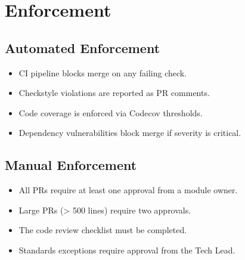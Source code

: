 \documentclass[
    language=english,
    doctype=standard,
    institution=none,
    titlestyle=book,
    oneside,
]{../../omnilatex}
\begin{document}
\chapter{Enforcement}
\label{sec:enforcement}

\section{Automated Enforcement}

\begin{itemize}
    \item CI pipeline blocks merge on any failing check.
    \item Checkstyle violations are reported as PR comments.
    \item Code coverage is enforced via Codecov thresholds.
    \item Dependency vulnerabilities block merge if severity is critical.
\end{itemize}

\section{Manual Enforcement}

\begin{itemize}
    \item All PRs require at least one approval from a module owner.
    \item Large PRs (> 500 lines) require two approvals.
    \item The code review checklist must be completed.
    \item Standards exceptions require approval from the Tech Lead.
\end{itemize}

\printbibliography[heading=bibintoc, title={References}]
\end{document}
